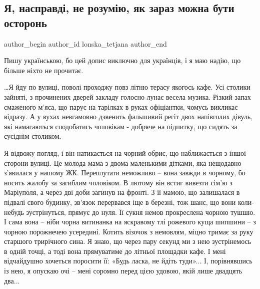  
 
 
 
 
 
\subsection{Я, насправді, не розумію, як зараз можна бути осторонь}
\label{sec:14_06_2022.fb.lonska_tetjana.1.ostoron}
 
\ifcmt
 author_begin
   author_id lonska_tetjana
 author_end
\fi

Пишу українською, бо цей допис виключно для українців, і я маю надію, що більше ніхто не прочитає.

…Я йду по вулиці, поволі проходжу повз літню терасу якогось кафе. Усі
столики зайняті, з прочинених дверей закладу голосно лунає весела музика.
Різкий запах смаженого м'яса, що парує на тарілках в руках  офіціантки,
чомусь викликає відразу. А у вухах невгамовно дзвенить фальшивий регіт
двох напівголих дівуль, які намагаються сподобатись чоловікам - добряче на
підпитку, що сидять за сусіднім столиком.  

Я відвожу погляд, і він натикається на чорний обрис, що наближається з
іншої сторони вулиці. Це молода мама з двома маленькими дітками, яка
нещодавно з'явилася у нашому ЖК. Переплутати неможливо – вона завжди в
чорному, бо носить жалобу за загиблим чоловіком. В лютому він встиг
вивезти сім'ю з Маріуполя, а через дві доби загинув на фронті.  З її
мамою, що залишалася в підвалі свого будинку, зв'язок перервався іще в
березні, тож шанс, що вони коли-небудь зустрінуться, прямує до нуля. Її
сукня немов прокреслена чорною тушшю. І сама вона – ніби чорна витинанка
на яскравому тлі рожевого куща шипшини – з чорною порожнечею усередині.
Котить візочок з немовлям, міцно тримає за руку старшого трирічного сина.
Я знаю, що через пару секунд ми з нею зустрінемось в одній точці, а тоді
вона прямуватиме до літньої площадки кафе. І мені відчайдушно хочеться
поросити її: «Будь ласка, не йдіть туди»... І, порівнявшись із нею, я
опускаю очі – мені соромно перед цією удовою, якій лише двадцять два...

